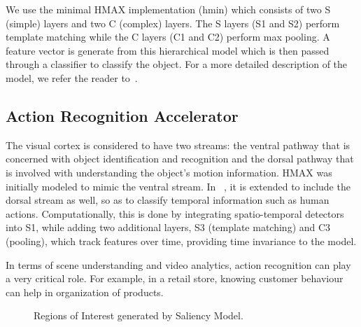 We use the minimal HMAX implementation (hmin) which consists of two S (simple) layers and two C (complex) layers. The S layers (S1 and S2) perform template matching while the C layers (C1 and C2) perform max pooling. A feature vector is generate from this hierarchical model which is then passed through a classifier to classify the object. For a more detailed description of the model, we refer the reader to~\cite{Mutch2008}.

\subsection{Action Recognition Accelerator}
The visual cortex is considered to have two streams: the ventral pathway that is concerned with object identification and recognition and the dorsal pathway that is involved with understanding the object's motion information. HMAX was initially modeled to mimic the ventral stream. In ~\cite{action-recognition}, it is extended to include the dorsal stream as well, so as to classify temporal information such as human actions. Computationally, this is done by integrating spatio-temporal detectors into S1, while adding two additional layers, S3 (template matching) and C3 (pooling), which track features over time, providing time invariance to the model.

In terms of scene understanding and video analytics, action recognition can play a very critical role. For example, in a retail store, knowing customer behaviour can help in organization of products. 

\begin{figure}[ht!]
\centering
{}
\caption{\label{fig:RoIs_campus_000042} Regions of Interest generated by Saliency Model.}
\end{figure}

